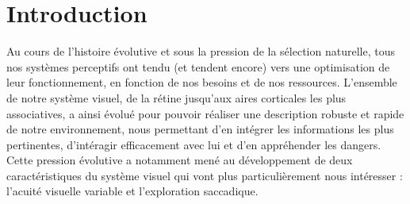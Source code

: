 
\chapter{Introduction} %
\label{Introduction} %


\newcommand{\keyword}[1]{\textbf{#1}}
\newcommand{\tabhead}[1]{\textbf{#1}}
\newcommand{\code}[1]{\texttt{#1}}
\newcommand{\file}[1]{\texttt{\bfseries#1}}
\newcommand{\option}[1]{\texttt{\itshape#1}}


Au cours de l'histoire évolutive et sous la pression de la sélection naturelle, tous nos systèmes perceptifs ont tendu (et tendent encore) vers une optimisation de leur fonctionnement, en fonction de nos besoins et de nos ressources.
L'ensemble de notre système visuel, de la rétine jusqu'aux aires corticales les plus associatives, a ainsi évolué pour pouvoir réaliser une description robuste et rapide de notre environnement, nous permettant d'en intégrer les informations les plus pertinentes, d'intéragir efficacement avec lui et d'en appréhender les dangers.
Cette pression évolutive a notamment mené au développement de deux caractéristiques du système visuel qui vont plus particulièrement nous intéresser : l'acuité visuelle variable et l'exploration saccadique. \autocite{Werner2014} \\

